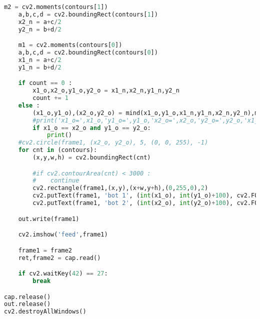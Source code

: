 \documentclass{article}
\begin{document}
\begin{lstlisting}[language=python,caption={Source Code}]
    m2 = cv2.moments(contours[1])
    a,b,c,d = cv2.boundingRect(contours[1])
    x2_n = a+c/2
    y2_n = b+d/2

    m1 = cv2.moments(contours[0])
    a,b,c,d = cv2.boundingRect(contours[0])
    x1_n = a+c/2
    y1_n = b+d/2

    if count == 0 :
        x1_o,x2_o,y1_o,y2_o = x1_n,x2_n,y1_n,y2_n
        count += 1
    else :
        (x1_o,y1_o),(x2_o,y2_o) = mind(x1_o,y1_o,x1_n,y1_n,x2_n,y2_n),mind(x2_o,y2_o,x1_n,y1_n,x2_n,y2_n)
        #print('x1_o=',x1_o,'y1_o=',y1_o,'x2_o=',x2_o,'y2_o=',y2_o,'x1_n=',x1_n,'y1_n=',y1_n,'x2_n=',x2_n,'y2_n=',y2_n)
        if x1_o == x2_o and y1_o == y2_o:
            print()
    #cv2.circle(frame1, (x2_o, y2_o), 5, (0, 0, 255), -1)
    for cnt in (contours):
        (x,y,w,h) = cv2.boundingRect(cnt)

        #if cv2.contourArea(cnt) < 3000 :
        #    continue
        cv2.rectangle(frame1,(x,y),(x+w,y+h),(0,255,0),2)
        cv2.putText(frame1, 'bot 1', (int(x1_o), int(y1_o)+100), cv2.FONT_HERSHEY_SIMPLEX, 0.9, (0,255,0), 2)
        cv2.putText(frame1, 'bot 2', (int(x2_o), int(y2_o)+100), cv2.FONT_HERSHEY_SIMPLEX, 0.9, (0,255,0), 2)

    out.write(frame1)

    cv2.imshow('feed',frame1)

    frame1 = frame2
    ret,frame2 = cap.read()

    if cv2.waitKey(42) == 27:
        break

cap.release()
out.release()
cv2.destroyAllWindows()
\end{lstlisting}
\end{document}
